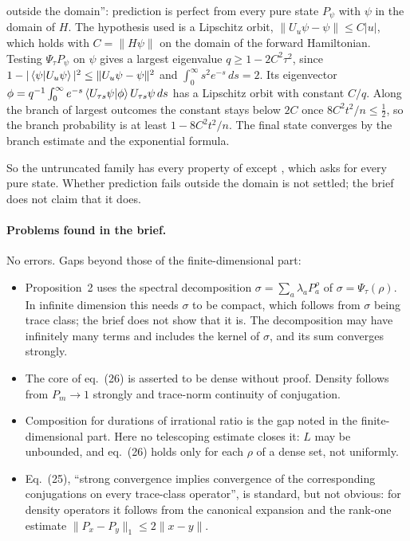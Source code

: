\documentclass[11pt]{article}
\begin{document}
\begin{itemize}
\begin{itemize}
    outside the domain'': prediction is perfect from every pure state $P_\psi$ with $\psi$ in the
    domain of $H$. The hypothesis used is a Lipschitz orbit, $\|U_u\psi - \psi\| \le C|u|$, which
    holds with $C = \|H\psi\|$ on the domain of the forward Hamiltonian. Testing $\Psi_\tau P_\psi$ on
    $\psi$ gives a largest eigenvalue $q \ge 1 - 2C^2\tau^2$, since $1 - |\braket{\psi|U_u\psi}|^2
    \le \|U_u\psi - \psi\|^2$ and $\int_0^\infty s^2e^{-s}\,ds = 2$. Its eigenvector
    $\phi = q^{-1}\int_0^\infty e^{-s}\braket{U_{\tau s}\psi|\phi}U_{\tau s}\psi\,ds$ has a
    Lipschitz orbit with constant $C/q$. Along the branch of largest outcomes the constant stays
    below $2C$ once $8C^2t^2/n \le \frac12$, so the branch probability is at least
    $1 - 8C^2t^2/n$. The final state converges by the branch estimate and the exponential formula.
  \end{itemize}
  So the untruncated family has every property of  except
  , which asks for every pure state. Whether prediction fails outside the
  domain is not settled; the brief does not claim that it does.
\end{itemize}

\paragraph{Problems found in the brief.} No errors. Gaps beyond those of the finite-dimensional
part:
\begin{itemize}
\item Proposition~2 uses the spectral decomposition $\sigma = \sum_a\lambda_aP_a^\rho$ of
  $\sigma = \Psi_\tau(\rho)$. In infinite dimension this needs $\sigma$ to be compact, which
  follows from $\sigma$ being trace class; the brief does not show that it is. The decomposition
  may have infinitely many terms and includes the kernel of $\sigma$, and its sum converges
  strongly.
\item The core of eq.~(26) is asserted to be dense without proof. Density follows from $P_m \to 1$
  strongly and trace-norm continuity of conjugation.
\item Composition for durations of irrational ratio is the gap noted in the finite-dimensional
  part. Here no telescoping estimate closes it: $L$ may be unbounded, and eq.~(26) holds only
  for each $\rho$ of a dense set, not uniformly.
\item Eq.~(25), ``strong convergence implies convergence of the corresponding conjugations on
  every trace-class operator'', is standard, but not obvious: for density operators it follows from
  the canonical expansion and the rank-one estimate $\|P_x - P_y\|_1 \le 2\|x - y\|$.
\end{itemize}
\end{document}
